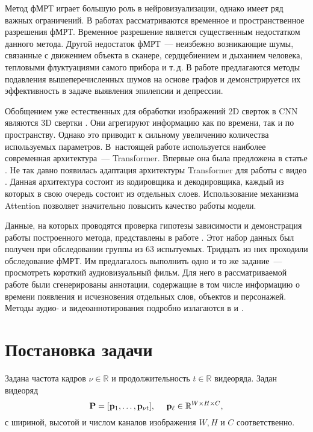 \documentclass[a4paper, 12pt]{article}
\begin{document}
	Метод фМРТ играет большую роль в нейровизуализации, однако имеет ряд важных ограничений.
	В работах \citep{menon1999spatial, logothetis2008we} рассматриваются 
	временное и пространственное разрешения фМРТ. Временное разрешение является существенным
	недостатком данного метода. Другой недостаток фМРТ~--- неизбежно возникающие шумы, 
	связанные с движением объекта в сканере, сердцебиением и дыханием человека, тепловыми
	флуктуациями самого прибора и т.\,д. В работе \citep{1804.10167} предлагаются методы 
	подавления вышеперечисленных шумов на основе графов и демонстрируется их эффективность в задаче
	выявления эпилепсии и депрессии.

	Обобщением уже естественных для обработки изображений 2D сверток в CNN являются 3D
	свертки \citep{Tran_2015_ICCV}.
	Они агрегируют информацию как по времени, так и по пространству.
	Однако это приводит к сильному увеличению количества используемых параметров.
	В~настоящей работе используется наиболее современная архитектура~--- Transformer.
	Впервые она была предложена в статье \citep{https://doi.org/10.48550/arxiv.1706.03762}.
	Не так давно появилась адаптация архитектуры Transformer для работы с видео
	\citep{https://doi.org/10.48550/arxiv.2201.04288}. Данная архитектура состоит из кодировщика
	и декодировщика, каждый из которых в свою очередь состоит из отдельных слоев. Использование 
	механизма Attention \citep{https://doi.org/10.48550/arxiv.1706.03762} 
	позволяет значительно повысить качество работы модели.

	Данные, на которых проводятся проверка гипотезы зависимости и демонстрация работы построенного 
	метода, представлены в работе \citep{Berezutskaya2022}. Этот набор данных был получен при
	обследовании группы из 63 испытуемых. Тридцать из них проходили обследование фМРТ.
	Им предлагалось выполнить одно и то же задание~--- просмотреть короткий аудиовизуальный фильм. 
	Для него в рассматриваемой работе были сгенерированы аннотации, содержащие в том числе информацию о времени появления и исчезновения
	отдельных слов, объектов и персонажей. Методы аудио- и видеоаннотирования подробно излагаются в
	\citep{boersma2018praat} и \citep{Berezutskaya2020}. 

\section{Постановка задачи}

	Задана частота кадров $\nu \in \mathbb{R}$ и продолжительность $t \in \mathbb{R}$ видеоряда. 
	Задан видеоряд
	\begin{equation}
		\label{eq1}
		\mathbf{P} = [\mathbf{p}_1, \ldots, \mathbf{p}_{\nu t}], \quad\
		\mathbf{p}_{\ell} \in \mathbb{R}^{W \times H \times C},
	\end{equation}
	с шириной, высотой и числом каналов изображения $W, H$ и 
	$C$ соответственно.
\end{document}
